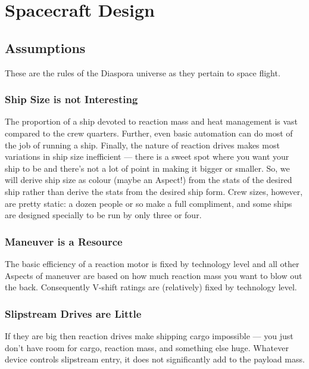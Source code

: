 \section{Spacecraft Design}\label{sec:Spacecraft Design} %

\subsection{Assumptions}\label{sec:Assumptions} %

These are the rules of the Diaspora universe as they pertain to space flight.

\subsubsection{Ship Size is not Interesting}

The proportion of a ship devoted to reaction mass and heat management
is vast compared to the crew quarters. Further, even basic automation
can do most of the job of running a ship. Finally, the nature of
reaction drives makes most variations in ship size inefficient --- there
is a sweet spot where you want your ship to be and there's not a lot
of point in making it bigger or smaller. So, we will derive ship size
as colour (maybe an Aspect!) from the stats of the desired ship rather
than derive the stats from the desired ship form. Crew sizes, however,
are pretty static: a dozen people or so make a full compliment, and
some ships are designed specially to be run by only three or four.

\subsubsection{Maneuver is a Resource}

The basic efficiency of a reaction motor is fixed by technology level and all
other Aspects of maneuver are based on how much reaction mass you want to blow
out the back. Consequently V-shift ratings are (relatively) fixed by technology
level.

\subsubsection{Slipstream Drives are Little}

If they are big then reaction drives make shipping cargo impossible --- you just
don't have room for cargo, reaction mass, and something else huge. Whatever
device controls slipstream entry, it does not significantly add to the payload
mass.

